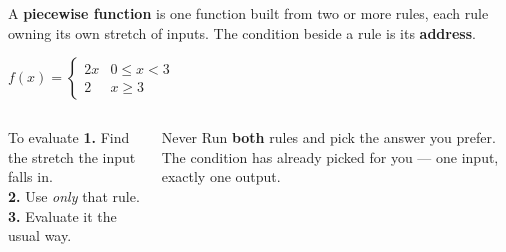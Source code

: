 \documentclass[aspectratio=169, 11pt]{beamer}
\begin{document}
\begin{frame}[t, plain]

  A \textbf{piecewise function} is one function built from two or more rules,
  each rule owning its own stretch of inputs. The condition beside a rule is its
  \textbf{address}.

  \bigskip
  \begin{center}
    {\Large \(f(x) = \begin{cases} 2x & 0 \le x < 3 \\[2pt] 2 & x \ge 3 \end{cases}\)}
  \end{center}

  \bigskip
  \begin{columns}[T]
      \begin{block}{To evaluate}
        \textbf{1.} Find the stretch the input falls in.\\[3pt]
        \textbf{2.} Use \textit{only} that rule.\\[3pt]
        \textbf{3.} Evaluate it the usual way.
      \end{block}

      \begin{block}{Never}
        Run \textbf{both} rules and pick the answer you prefer. The condition
        has already picked for you --- one input, exactly one output.
      \end{block}
  \end{columns}
\end{frame}
\end{document}
